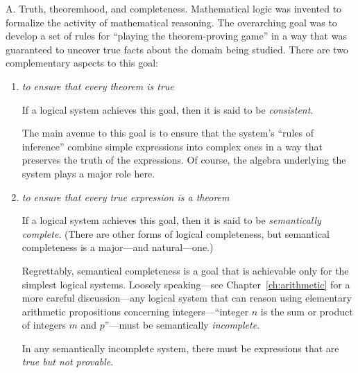 {\small\sf A. Truth, theoremhood, and completeness}.
Mathematical logic was invented to formalize the activity of
mathematical reasoning.  The overarching goal was to develop a set of
rules for ``playing the theorem-proving game'' in a way that was
guaranteed to uncover true facts about the domain being studied.
There are two complementary aspects to this goal:
\begin{enumerate}
\item
{\em to ensure that every theorem is true}

If a logical system achieves this goal, then it is said to be {\it
  consistent}. 

The main avenue to this goal is to ensure that the system's ``rules of
inference'' combine simple expressions into complex ones in a way that
preserves the truth of the expressions.  Of course, the algebra
underlying the system plays a major role here.

\item
{\em to ensure that every true expression is a theorem}

If a logical system achieves this goal, then it is said to be {\it
semantically complete}. 
(There are other forms of logical completeness, but semantical
completeness is a major---and natural---one.)

Regrettably, semantical completeness is a goal that is achievable only
for the simplest logical systems.  Loosely speaking---see
Chapter~\ref{ch:arithmetic} for a more careful discussion---any
logical system that can reason using elementary arithmetic propositions
concerning integers---``integer $n$ is the sum or product of integers
$m$ and $p$''---must be semantically {\em incomplete}.

In any semantically incomplete system, there must be expressions that
are {\em true but not provable}.
\end{enumerate}
\medskip

\noindent {}
\medskip

